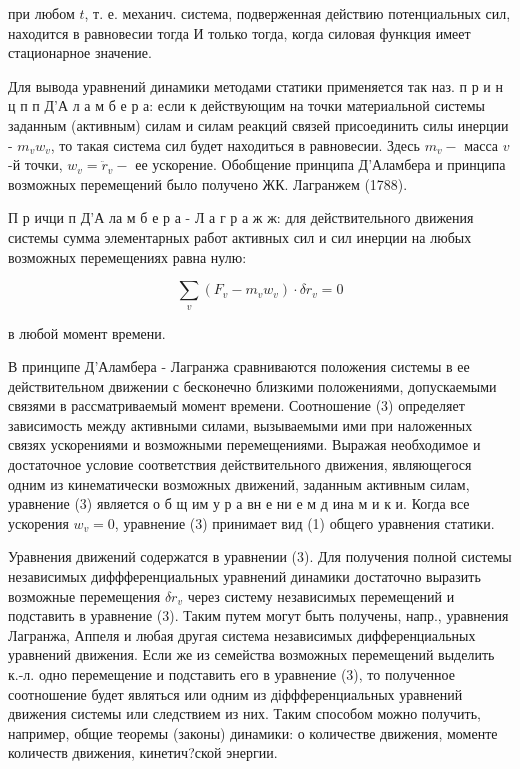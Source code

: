 \documentclass[10pt]{article}
\begin{document}
при любом $t$, т. е. механич. система, подверженная действию потенциальных сил, находится в равновесии тогда И только тогда, когда силовая функция имеет стационарное значение.



Для вывода уравнений динамики методами статики применяется так наз. п р и н ц п п Д'А л а м б е р а: если к действующим на точки материальной системы заданным (активным) силам и силам реакций связей присоединить силы инерции - $m_{v} w_{v}$, то такая система сил будет находиться в равновесии. Здесь $m_{v}-$ масса $v$-й точки, $w_{v}=\ddot{r}_{v}-$ ее ускорение. Обобщение принципа Д'Аламбера и принципа возможных перемещений было получено ЖК. Лагранжем (1788).



П р ичци п Д'А ла м б е р а - Л а г р а ж ж: для действительного движения системы сумма элементарных работ активных сил и сил инерции на любых возможных перемещениях равна нулю:



\[

\sum_{v}\left(F_{v}-m_{v} w_{v}\right) \cdot \delta r_{v}=0

\]



в любой момент времени.



В принципе Д'Аламбера - Лагранжа сравниваются положения системы в ее действительном движении с бесконечно близкими положениями, допускаемыми связями в рассматриваемый момент времени. Соотношение (3) определяет зависимость между активными силами, вызываемыми ими при наложенных связях ускорениями и возможными перемещениями. Выражая необходимое и достаточное условие соответствия действительного движения, являющегося одним из кинематически возможных движений, заданным активным силам, уравнение (3) является о б щ им у р а вн е ни е м д ина м и к и. Когда все ускорения $w_{v}=0$, уравнение (3) принимает вид (1) общего уравнения статики.



Уравнения движений содержатся в уравнении (3). Для получения полной системы независимых диффференциальных уравнений динамики достаточно выразить возможные перемещения $\delta r_{v}$ через систему независимых перемещений и подставить в уравнение (3). Таким путем могут быть получены, напр., уравнения Лагранжа, Аппеля и любая другая система независимых дифференциальных уравнений движения. Если же из семейства возможных перемещений выделить к.-л. одно перемещение и подставить его в уравнение (3), то полученное соотношение будет являться или одним из діффференциальных уравнений движения системы или следствием из них. Таким способом можно получить, например, общие теоремы (законы) динамики: о количестве движения, моменте количеств движения, кинетич?ской энергии.
\end{document}
